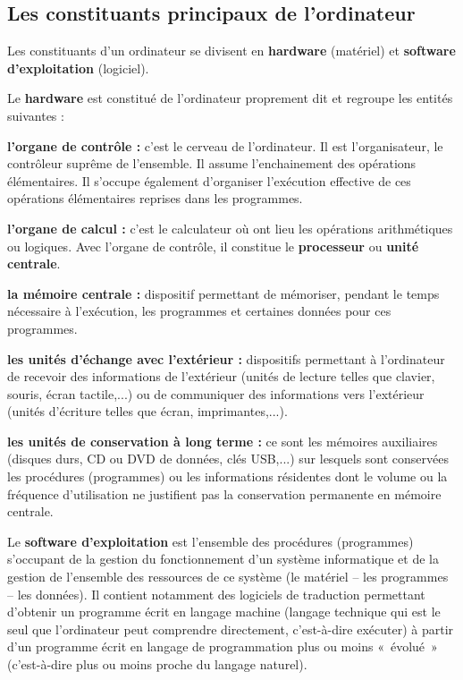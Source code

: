 	\subsection{Les constituants principaux de l’ordinateur}

		Les constituants d’un ordinateur se divisent en \textbf{hardware}
		(matériel) et \textbf{software d’exploitation} (logiciel).
		
		Le \textbf{hardware} est constitué de l’ordinateur proprement dit et
		regroupe les entités suivantes :

		\begin{liste}
		\item
			\textbf{l’organe de contrôle :} c’est le cerveau de
			l'ordinateur. Il est l’organisateur, le contrôleur
			suprême de l’ensemble. Il assume l’enchainement des opérations
			élémentaires. Il s’occupe également d’organiser l’exécution effective
			de ces opérations élémentaires reprises dans les programmes.
		\item
			\textbf{l’organe de calcul :} c’est le calculateur où ont lieu les
			opérations arithmétiques ou logiques. Avec l’organe de contrôle, il
			constitue le \textbf{processeur} ou \textbf{unité centrale}.
		\item
			\textbf{la mémoire centrale :} dispositif permettant de mémoriser,
			pendant le temps nécessaire à l’exécution, les programmes et certaines
			données pour ces programmes.
		\item
			\textbf{les unités d’échange avec l’extérieur :} dispositifs permettant
			à l’ordinateur de recevoir des informations de l’extérieur (unités de
			lecture telles que clavier, souris, écran tactile,...) ou de
			communiquer des informations vers l’extérieur (unités d’écriture telles
			que écran, imprimantes,...).
		\item
			\textbf{les unités de conservation à long terme :} ce sont les mémoires
			auxiliaires (disques durs, CD ou DVD de données, clés USB,...) sur
			lesquels sont conservées les procédures (programmes) ou les
			informations résidentes dont le volume ou la fréquence d’utilisation ne
			justifient pas la conservation permanente en mémoire centrale.
		\end{liste}
		
		Le \textbf{software d’exploitation} est l’ensemble des procédures
		(programmes) s’occupant de la gestion du fonctionnement d’un système
		informatique et de la gestion de l’ensemble des ressources de ce
		système (le matériel – les programmes – les données). Il contient
		notamment des logiciels de traduction permettant d’obtenir un programme
		écrit en langage machine (langage technique qui est le seul que
		l’ordinateur peut comprendre directement, c’est-à-dire exécuter) à
		partir d’un programme écrit en langage de programmation plus ou moins
		«~évolué~» (c’est-à-dire plus ou moins proche du langage naturel).

